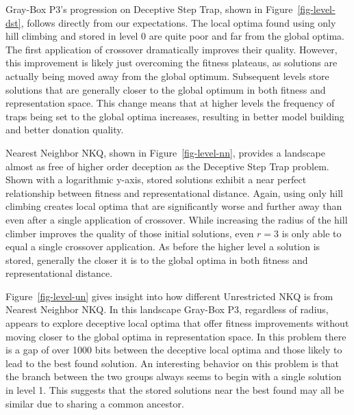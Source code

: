 Gray-Box P3's progression on Deceptive Step Trap, shown in Figure~\ref{fig-level-dst}, follows directly from our expectations.
The local optima found using only hill climbing and stored in level 0 are quite poor and far from the global optima.
The first application of crossover dramatically improves their quality. However, this improvement is likely just overcoming
the fitness plateaus, as solutions are actually being moved away from the global optimum. Subsequent levels store solutions
that are generally closer to the global optimum in both fitness and representation space. This change means that at higher
levels the frequency of traps being set to the global optima increases, resulting in better model building and better donation quality.

\begin{figure*}
  \centering
  \caption{Distribution of local optima stored at each level of Gray-Box P3 in relation to the best found by the run on
           a Nearest Neighbor NKQ problem $N=6000$ and $K=4$.}
  \label{fig-level-nn}
\end{figure*}

Nearest Neighbor NKQ, shown in Figure~\ref{fig-level-nn}, provides a landscape almost as free of higher order deception
as the Deceptive Step Trap problem.  Shown with a logarithmic y-axis, stored solutions exhibit a near perfect relationship
between fitness and representational distance. Again, using only hill climbing creates local optima that are significantly
worse and further away than even
after a single application of crossover. While increasing the radius of the hill climber improves the quality of those initial
solutions, even $r=3$ is only able to equal a single crossover application. As before the higher level a solution is stored,
generally the closer it is to the global optima in both fitness and representational distance.

\begin{figure*}
  \centering
  \caption{Distribution of local optima stored at each level of Gray-Box P3 in relation to the best found by the run on
           an Unrestricted NKQ problem $N=6000$ and $K=4$.}
  \label{fig-level-un}
\end{figure*}

Figure~\ref{fig-level-un} gives insight into how different Unrestricted NKQ is from Nearest Neighbor NKQ. In this landscape
Gray-Box P3, regardless of radius, appears to explore deceptive local optima that offer fitness improvements without moving
closer to the global optima in representation space. In this problem there is a gap of over 1000 bits between the deceptive
local optima and those likely to lead to the best found solution. An interesting behavior on this problem is that the branch
between the two groups always seems to begin with a single solution in level 1. This suggests that the stored solutions near
the best found may all be similar due to sharing a common ancestor.

